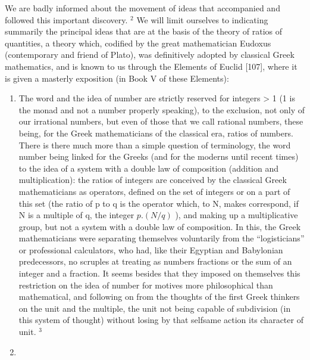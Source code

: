 We are badly informed about the movement of ideas that accompanied and followed this important discovery. \(^{2}\) We will limit ourselves to indicating summarily the principal ideas that are at the basis of the theory of ratios of quantities, a theory which, codified by the great mathematician Eudoxus (contemporary and friend of Plato), was definitively adopted by classical Greek mathematics, and is known to us through the Elements of Euclid {[}107{]}, where it is given a masterly exposition (in Book V of these Elements):

\begin{enumerate}
\def\labelenumi{\arabic{enumi})}
\item
  The word and the idea of number are strictly reserved for integers \textgreater{} 1 (1 is the monad and not a number properly speaking), to the exclusion, not only of our irrational numbers, but even of those that we call rational numbers, these being, for the Greek mathematicians of the classical era, ratios of numbers. There is there much more than a simple question of terminology, the word number being linked for the Greeks (and for the moderns until recent times) to the idea of a system with a double law of composition (addition and multiplication): the ratios of integers are conceived by the classical Greek mathematicians as operators, defined on the set of integers or on a part of this set (the ratio of p to q is the operator which, to N, makes correspond, if N is a multiple of q, the integer \(p.(N/q)\) ), and making up a multiplicative group, but not a system with a double law of composition. In this, the Greek mathematicians were separating themselves voluntarily from the ``logisticians'' or professional calculators, who had, like their Egyptian and Babylonian predecessors, no scruples at treating as numbers fractions or the sum of an integer and a fraction. It seems besides that they imposed on themselves this restriction on the idea of number for motives more philosophical than mathematical, and following on from the thoughts of the first Greek thinkers on the unit and the multiple, the unit not being capable of subdivision (in this system of thought) without losing by that selfsame action its character of unit. \(^{3}\)
\item

\end{enumerate}
